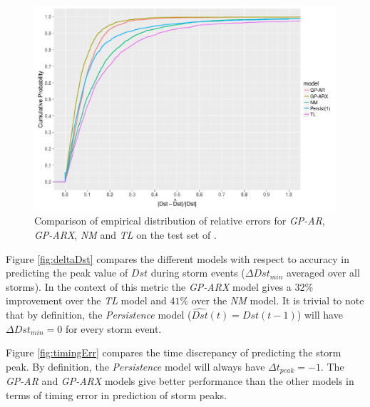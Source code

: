 \documentclass[referee,a4paper,12pt,traditabstract]{swsc}
\begin{document}
\begin{linenumbers}
\begin{figure}
   \centering
   \includegraphics[width=\textwidth]{Compare_RelProb.png}
   \caption{Comparison of empirical distribution of relative errors for \emph{GP-AR}, \emph{GP-ARX}, \emph{NM} and \emph{TL} on the test set of \citet{Ji2012}.}
   \label{fig:relprob}
\end{figure}

Figure \ref{fig:deltaDst} compares the different models with respect to accuracy in predicting the peak value of $Dst$ during storm events ($\Delta Dst_{min}$ averaged over all storms). In the context of this metric the \emph{GP-ARX} model gives a $32\%$ improvement over the \emph{TL} model and $41\%$ over the \emph{NM} model. It is trivial to note that by definition, the \emph{Persistence} model ($\hat{Dst}(t) = Dst(t-1)$) will have $\Delta Dst_{min} = 0$ for every storm event.

Figure \ref{fig:timingErr} compares the time discrepancy of predicting the storm peak. By definition, the \emph{Persistence} model will always have $\Delta t_{peak} = -1$. The \emph{GP-AR} and \emph{GP-ARX} models give better performance than the other models in terms of timing error in prediction of storm peaks. 


\end{linenumbers}
\end{document}
